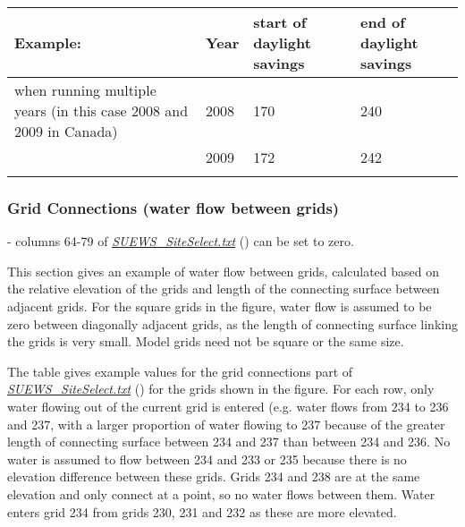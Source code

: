 \documentclass[letterpaper,10pt,english]{sphinxmanual}
\begin{document}
\begin{DUlineblock}{0em}
\item[] 
\item[] 
\end{DUlineblock}


\begin{savenotes}\sphinxattablestart
\centering
\begin{tabulary}{\linewidth}[t]{|T|T|T|T|}
\hline
\sphinxstyletheadfamily 
Example:
&\sphinxstyletheadfamily 
Year
&\sphinxstyletheadfamily 
start of
daylight
savings
&\sphinxstyletheadfamily 
end of daylight
savings
\\
\hline
when running
multiple years
(in this case
2008 and 2009
in Canada)
&
2008
&
170
&
240
\\
\hline&
2009
&
172
&
242
\\
\hline&&&\\
\hline
\end{tabulary}
\par
\sphinxattableend\end{savenotes}


\subsubsection{Grid Connections (water flow between grids)}
\label{\detokenize{input_files/SUEWS_SiteInfo/SUEWS_SiteSelect:grid-connections-water-flow-between-grids}}
 - columns 64-79 of
{\hyperref[\detokenize{input_files/SUEWS_SiteInfo/SUEWS_SiteSelect:SUEWS_SiteSelect.txt}]{\emph{SUEWS\_SiteSelect.txt}}} () can be set to zero.

This section gives an example of water flow between grids, calculated
based on the relative elevation of the grids and length of the
connecting surface between adjacent grids. For the square grids in the
figure, water flow is assumed to be zero between diagonally adjacent
grids, as the length of connecting surface linking the grids is very
small. Model grids need not be square or the same size.

The table gives example values for the grid connections part of
{\hyperref[\detokenize{input_files/SUEWS_SiteInfo/SUEWS_SiteSelect:SUEWS_SiteSelect.txt}]{\emph{SUEWS\_SiteSelect.txt}}} () for the grids shown in
the figure. For each row, only water flowing out of the current grid is
entered (e.g. water flows from 234 to 236 and 237, with a larger
proportion of water flowing to 237 because of the greater length of
connecting surface between 234 and 237 than between 234 and 236. No
water is assumed to flow between 234 and 233 or 235 because there is no
elevation difference between these grids. Grids 234 and 238 are at the
same elevation and only connect at a point, so no water flows between
them. Water enters grid 234 from grids 230, 231 and 232 as these are
more elevated.
\end{document}
